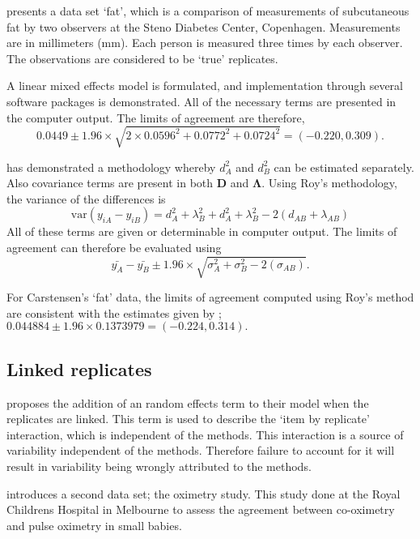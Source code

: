 \documentclass[MAIN.tex]{subfiles}
\begin{document}
	\citet{BXC2008} presents a data set `fat', which is a comparison of measurements of subcutaneous fat
	by two observers at the Steno Diabetes Center, Copenhagen. Measurements are in millimeters
	(mm). Each person is measured three times by each observer. The observations are considered to be `true' replicates.
	
	A linear mixed effects model is formulated, and implementation through several software packages is demonstrated.
	All of the necessary terms are presented in the computer output. The limits of agreement are therefore,
	\begin{equation}
	0.0449  \pm 1.96 \times  \sqrt{2 \times 0.0596^2 + 0.0772^2 + 0.0724^2} = (-0.220,  0.309).
	\end{equation}
	
	\citet{roy} has demonstrated a methodology whereby $d^2_{A}$ and $d^2_{B}$ can be estimated separately. Also covariance terms are present in both $\boldsymbol{D}$ and $\boldsymbol{\Lambda}$. Using Roy's methodology, the variance of the differences is
	\begin{equation}
	\mbox{var} (y_{iA}-y_{iB})= d^2_{A} + \lambda^2_{B} + d^2_{A} + \lambda^2_{B} - 2(d_{AB} + \lambda_{AB})
	\end{equation}
	All of these terms are given or determinable in computer output.
	The limits of agreement can therefore be evaluated using
	\begin{equation}
	\bar{y_{A}}-\bar{y_{B}} \pm 1.96 \times \sqrt{ \sigma^2_{A} + \sigma^2_{B}  - 2(\sigma_{AB})}.
	\end{equation}
	
	For Carstensen's `fat' data, the limits of agreement computed using Roy's
	method are consistent with the estimates given by \citet{BXC2008}; $0.044884  \pm 1.96 \times  0.1373979 = (-0.224,  0.314).$
	
	\subsection{Linked replicates}
	
	\citet{BXC2008} proposes the addition of an random effects term to their model when the replicates are linked. This term is used to describe the `item by replicate' interaction, which is independent of the methods. This interaction is a source of variability independent of the methods. Therefore failure to account for it will result in variability being wrongly attributed to the methods.
	
	\citet{BXC2008} introduces a second data set; the oximetry study. This study done at the Royal Childrens Hospital in
	Melbourne to assess the agreement between co-oximetry and pulse oximetry in small babies.
	
\end{document}
